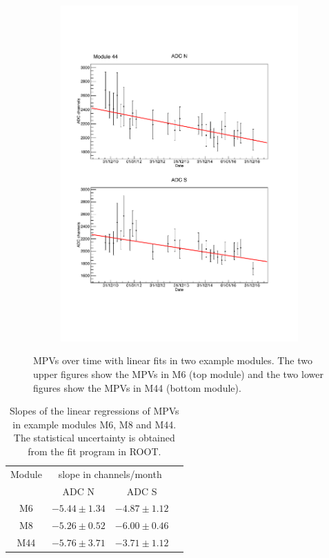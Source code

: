 \begin{figure}[hp!]
\begin{subfigure}{0.6\linewidth}
    \includegraphics[width=\linewidth{}]{./fig/M44mpv.pdf}
    \caption{}
    \label{fig:MPV_M44}
  \end{subfigure}
  \caption{MPVs over time with linear fits in two example modules. The two upper figures show the MPVs in M6 (top module) and the two lower figures show the MPVs in M44 (bottom module).}
  \label{fig:MPV}
\end{figure}

%

\begin{table}[hb!]
  \centering
  \caption{Slopes of the linear regressions of MPVs in example modules M6, M8 and M44. The statistical uncertainty is obtained from the fit program in ROOT. }
  \label{tab:mpv}
  \begin{tabular}{c c c c}
  \toprule
  Module & \multicolumn{2}{c}{slope in channels/month} \\
         & ADC N & ADC S \\
  \midrule
  M6  & $-5.44\pm1.34$ & $-4.87\pm1.12$ \\
  M8  & $-5.26\pm0.52$ & $-6.00\pm0.46$ \\
  M44 & $-5.76\pm3.71$ & $-3.71\pm1.12$ \\
  \bottomrule
  \end{tabular}
\end{table}

